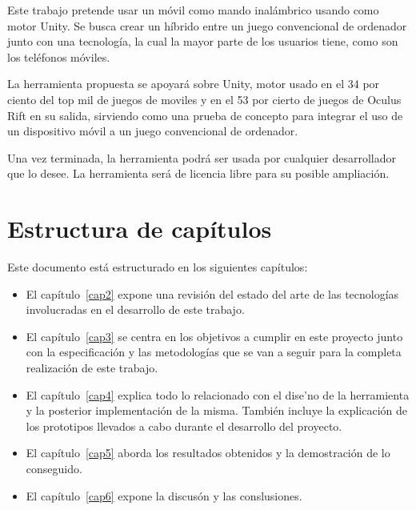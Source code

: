 Este trabajo pretende usar un m\'ovil como mando inal\'ambrico usando como motor Unity. Se busca crear un h\'ibrido entre un juego convencional de ordenador
 junto con una tecnolog\'ia, la cual la mayor parte de los usuarios tiene, como son los tel\'efonos m\'oviles.

La herramienta propuesta se apoyar\'a sobre Unity, motor usado en el 34 por ciento del top mil de juegos de moviles y en el 53 por cierto de juegos de Oculus Rift en su salida,
 sirviendo como una prueba de concepto para integrar el uso de un dispositivo m\'ovil a un juego convencional de ordenador.

Una vez terminada,  la herramienta podr\'a ser usada por cualquier desarrollador que lo desee. La herramienta ser\'a de licencia libre para su posible ampliaci\'on. 

\section{Estructura de cap\'itulos}
\label{cap1:sec:estructura}

Este documento est\'a estructurado en los siguientes cap\'itulos:

\begin{itemize}
\item El cap\'itulo~\ref{cap2} expone una revisi\'on del estado del arte de las tecnolog\'ias involucradas en el desarrollo de este trabajo.

\item El cap\'itulo~\ref{cap3} se centra en los objetivos a cumplir en este proyecto junto con la especificaci\'on y las metodolog\'ias que se van a seguir para la completa realizaci\'on de este trabajo.

\item El cap\'itulo~\ref{cap4} explica todo lo relacionado con el dise'no de la herramienta y la posterior implementaci\'on de la misma. Tambi\'en incluye la explicaci\'on de los prototipos llevados a cabo durante el desarrollo del proyecto.

\item El cap\'itulo~\ref{cap5} aborda los resultados obtenidos y la demostraci\'on de lo conseguido.

\item El cap\'itulo~\ref{cap6} expone la discus\'on y las conslusiones.
\end{itemize}




